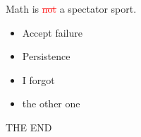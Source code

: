 \documentclass[14pt]{beamer}
\begin{document}
\begin{frame}\Large
  \begin{center}
    Math is \textcolor{red}{\sout{not}} a spectator sport.
  \end{center}
\end{frame}

\begin{frame}\Large
  \begin{itemize}
  \item Accept failure
  \item Persistence
  \end{itemize}
\end{frame}

\begin{frame}\Large
  \begin{itemize}
  \item I forgot
  \item the other one
  \end{itemize}
\end{frame}

\begin{frame}\Large
  \begin{center}
    THE END
  \end{center}
\end{frame}
\end{document}
